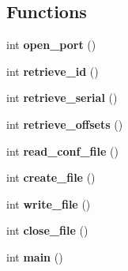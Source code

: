 \subsection*{Functions}
\begin{DoxyCompactItemize}
\item 
\mbox{\label{qbmove__backup_8c_abe553924eef0ba8079dc745caf1f348c}} 
int {\bfseries open\+\_\+port} ()
\item 
\mbox{\label{qbmove__backup_8c_a19c7b4350b59e9273c8e5d38b2fee7e5}} 
int {\bfseries retrieve\+\_\+id} ()
\item 
\mbox{\label{qbmove__backup_8c_a820b26a1bfda44d50dcc4f87ec4b15e4}} 
int {\bfseries retrieve\+\_\+serial} ()
\item 
\mbox{\label{qbmove__backup_8c_acdbd97da27f51d67ecda3406dbe99b2e}} 
int {\bfseries retrieve\+\_\+offsets} ()
\item 
\mbox{\label{qbmove__backup_8c_a0b13dd1f535e14e1c234db426fdea510}} 
int {\bfseries read\+\_\+conf\+\_\+file} ()
\item 
\mbox{\label{qbmove__backup_8c_a67dbcb6dbe01df19e9379c9ed2204664}} 
int {\bfseries create\+\_\+file} ()
\item 
\mbox{\label{qbmove__backup_8c_a3221e1b236b178ebbb7cd09f7daf1842}} 
int {\bfseries write\+\_\+file} ()
\item 
\mbox{\label{qbmove__backup_8c_a327b46c721e061a90dec276552bdf79e}} 
int {\bfseries close\+\_\+file} ()
\item 
\mbox{\label{qbmove__backup_8c_ae66f6b31b5ad750f1fe042a706a4e3d4}} 
int {\bfseries main} ()
\end{DoxyCompactItemize}
